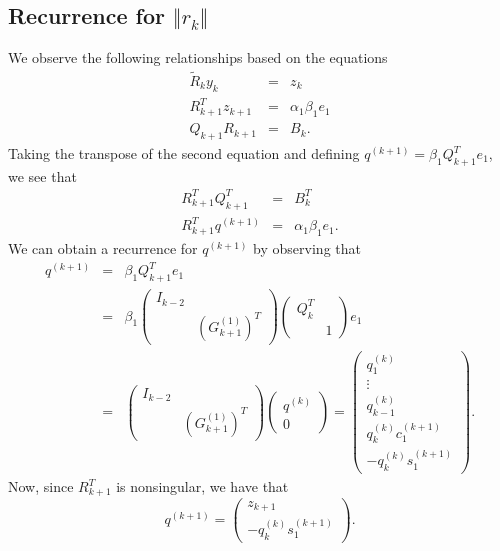 \documentclass[11pt]{article}
\begin{document}
\subsection{Recurrence for $\Vert r_k \Vert$}
We observe the following relationships based on the equations
\begin{eqnarray}
\tilde{R}_k y_k &=& z_k \\
R^T_{k+1} z_{k+1} &=& \alpha_1 \beta_1 e_1 \\
Q_{k+1} R_{k+1} &=& B_k.
\end{eqnarray}
Taking the transpose of the second equation and defining $q^{(k+1)} = \beta_1 Q^T_{k+1} e_1$, we see that
\begin{eqnarray}
R^T_{k+1} Q^T_{k+1} &=& B^T_k \\
R^T_{k+1} q^{(k+1)} &=& \alpha_1 \beta_1 e_1.
\end{eqnarray}
We can obtain a recurrence for $q^{(k+1)}$ by observing that
\begin{eqnarray*}
q^{(k+1)} &=& \beta_1 Q^T_{k+1} e_1 \\
&=& \beta_1 \begin{pmatrix}
I_{k-2} & \\ & \left(G^{(1)}_{k+1}\right)^T
\end{pmatrix} \begin{pmatrix}
Q^T_{k} & \\ & 1
\end{pmatrix} e_1 \\
&=& \begin{pmatrix}
I_{k-2} & \\ & \left(G^{(1)}_{k+1}\right)^T
\end{pmatrix} \begin{pmatrix} q^{(k)} \\ 0 \end{pmatrix} = \begin{pmatrix} q^{(k)}_1 \\ \vdots \\ q^{(k)}_{k-1} \\ q^{(k)}_k c^{(k+1)}_1\\ -q^{(k)}_k s^{(k+1)}_1 \end{pmatrix}.
\end{eqnarray*}
Now, since $R^T_{k+1}$ is nonsingular, we have that
\begin{equation}
q^{(k+1)} = \begin{pmatrix}
z_{k+1} \\ -q^{(k)}_k s^{(k+1)}_1 
\end{pmatrix}.
\end{equation}
\end{document}
